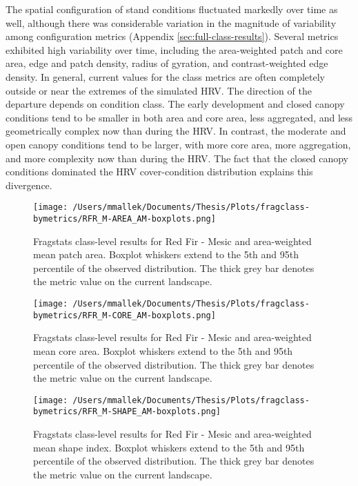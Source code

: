The spatial configuration of stand conditions fluctuated markedly over time as well, although there was considerable variation in the magnitude of variability among configuration metrics (Appendix \ref{sec:full-class-results}). Several metrics exhibited high variability over time, including the area-weighted patch and core area, edge and patch density, radius of gyration, and contrast-weighted edge density. In general, current values for the class metrics are often completely outside or near the extremes of the simulated HRV. The direction of the departure depends on condition class. The early development and closed canopy conditions tend to be smaller in both area and core area, less aggregated, and less geometrically complex now than during the HRV. In contrast, the moderate and open canopy conditions tend to be larger, with more core area, more aggregation, and more complexity now than during the HRV. The fact that the closed canopy conditions dominated the HRV cover-condition distribution explains this divergence.

\begin{figure}[!htbp]
\centering
    \texttt{[image: /Users/mmallek/Documents/Thesis/Plots/fragclass-bymetrics/RFR\_M-AREA\_AM-boxplots.png]}
  \caption{Fragstats class-level results for Red Fir - Mesic and area-weighted mean patch area. Boxplot whiskers extend to the 5th and 95th percentile of the observed distribution. The thick grey bar denotes the metric value on the current landscape.}
  \label{fig:rfrm_areaam}
\end{figure}


\begin{figure}[!htbp]
\centering
    \texttt{[image: /Users/mmallek/Documents/Thesis/Plots/fragclass-bymetrics/RFR\_M-CORE\_AM-boxplots.png]}
  \caption{Fragstats class-level results for Red Fir - Mesic and area-weighted mean core area. Boxplot whiskers extend to the 5th and 95th percentile of the observed distribution. The thick grey bar denotes the metric value on the current landscape.}
  \label{fig:rfrm_coream}
\end{figure}


\begin{figure}[!htbp]
\centering
    \texttt{[image: /Users/mmallek/Documents/Thesis/Plots/fragclass-bymetrics/RFR\_M-SHAPE\_AM-boxplots.png]}
  \caption{Fragstats class-level results for Red Fir - Mesic and area-weighted mean shape index. Boxplot whiskers extend to the 5th and 95th percentile of the observed distribution. The thick grey bar denotes the metric value on the current landscape.}
  \label{fig:rfrm_shapeam}
\end{figure}


